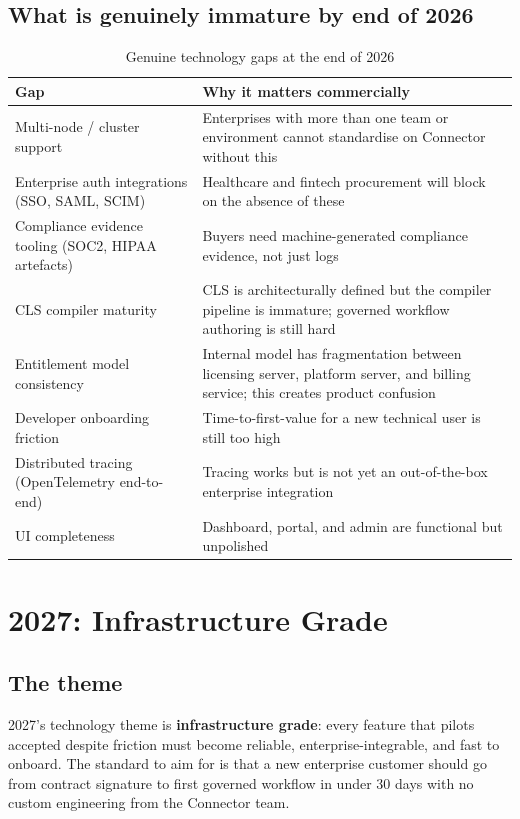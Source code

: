 \subsection{What is genuinely immature by end of 2026}

\begin{table}[H]
\centering
\renewcommand{\arraystretch}{1.45}
\begin{tabularx}{\textwidth}{@{}lX@{}}
\toprule
\textbf{Gap} & \textbf{Why it matters commercially} \\
\midrule
Multi-node / cluster support & Enterprises with more than one team or environment cannot standardise on Connector without this \\
Enterprise auth integrations (SSO, SAML, SCIM) & Healthcare and fintech procurement will block on the absence of these \\
Compliance evidence tooling (SOC2, HIPAA artefacts) & Buyers need machine-generated compliance evidence, not just logs \\
CLS compiler maturity & CLS is architecturally defined but the compiler pipeline is immature; governed workflow authoring is still hard \\
Entitlement model consistency & Internal model has fragmentation between licensing server, platform server, and billing service; this creates product confusion \\
Developer onboarding friction & Time-to-first-value for a new technical user is still too high \\
Distributed tracing (OpenTelemetry end-to-end) & Tracing works but is not yet an out-of-the-box enterprise integration \\
UI completeness & Dashboard, portal, and admin are functional but unpolished \\
\bottomrule
\end{tabularx}
\caption{Genuine technology gaps at the end of 2026}
\end{table}

\section{2027: Infrastructure Grade}

\subsection{The theme}

2027's technology theme is \textbf{infrastructure grade}: every feature that
pilots accepted despite friction must become reliable, enterprise-integrable,
and fast to onboard. The standard to aim for is that a new enterprise customer
should go from contract signature to first governed workflow in under 30 days
with no custom engineering from the Connector team.

